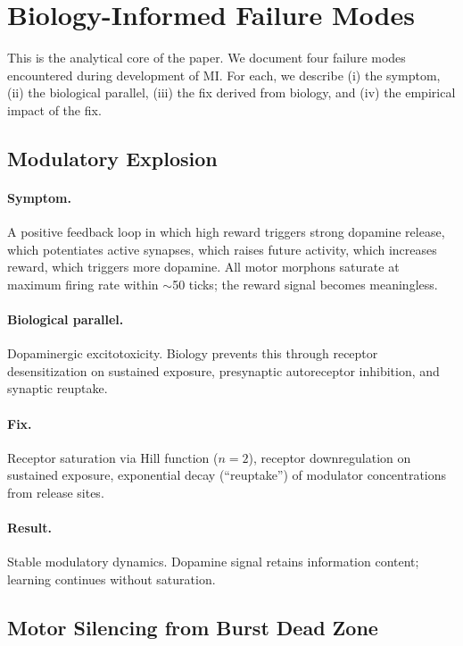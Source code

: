 \section{Biology-Informed Failure Modes}
\label{sec:failure_modes}

This is the analytical core of the paper. We document four failure modes encountered during development of MI. For each, we describe (i) the symptom, (ii) the biological parallel, (iii) the fix derived from biology, and (iv) the empirical impact of the fix.

\subsection{Modulatory Explosion}

\paragraph{Symptom.}
A positive feedback loop in which high reward triggers strong dopamine release, which potentiates active synapses, which raises future activity, which increases reward, which triggers more dopamine. All motor morphons saturate at maximum firing rate within $\sim$50 ticks; the reward signal becomes meaningless.

\paragraph{Biological parallel.}
Dopaminergic excitotoxicity. Biology prevents this through receptor desensitization on sustained exposure, presynaptic autoreceptor inhibition, and synaptic reuptake.

\paragraph{Fix.}
Receptor saturation via Hill function ($n=2$), receptor downregulation on sustained exposure, exponential decay (``reuptake'') of modulator concentrations from release sites.

\paragraph{Result.}
Stable modulatory dynamics. Dopamine signal retains information content; learning continues without saturation.

\subsection{Motor Silencing from Burst Dead Zone}

